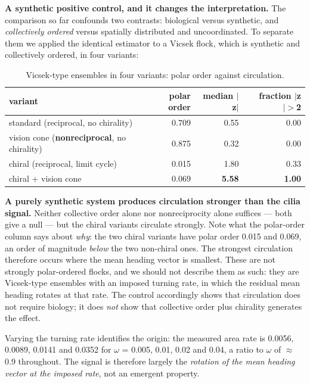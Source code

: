 \documentclass[aps,pre,preprint,superscriptaddress,nofootinbib,longbibliography]{revtex4-2}
\begin{document}
\textbf{A synthetic positive control, and it changes the interpretation.} The comparison so far confounds two contrasts: biological versus synthetic, and \emph{collectively ordered} versus spatially distributed and uncoordinated. To separate them we applied the identical estimator to a Vicsek flock, which is synthetic and collectively ordered, in four variants:

\begin{table}[htbp]
\caption{Vicsek-type ensembles in four variants: polar order against circulation.}
\label{tab:20}
\begin{ruledtabular}
\begin{tabular}{lrrr}
variant & polar order & median $|$z$|$ & fraction $|$z$| >$2 \\
\hline
standard (reciprocal, no chirality) & 0.709 & 0.55 & 0.00 \\
vision cone (\textbf{nonreciprocal}, no chirality) & 0.875 & 0.32 & 0.00 \\
chiral (reciprocal, limit cycle) & 0.015 & 1.80 & 0.33 \\
chiral + vision cone & 0.069 & \textbf{5.58} & \textbf{1.00} \\
\end{tabular}
\end{ruledtabular}
\end{table}

\textbf{A purely synthetic system produces circulation stronger than the cilia signal.} Neither collective order alone nor nonreciprocity alone suffices --- both give a null --- but the chiral variants circulate strongly. Note what the polar-order column says about \emph{why}: the two chiral variants have polar order 0.015 and 0.069, an order of magnitude \emph{below} the two non-chiral ones. The strongest circulation therefore occurs where the mean heading vector is smallest. These are not strongly polar-ordered flocks, and we should not describe them as such: they are Vicsek-type ensembles with an imposed turning rate, in which the residual mean heading rotates at that rate. The control accordingly shows that circulation does not require biology; it does \emph{not} show that collective order plus chirality generates the effect.

Varying the turning rate identifies the origin: the measured area rate is 0.0056, 0.0089, 0.0141 and 0.0352 for $\omega$ = 0.005, 0.01, 0.02 and 0.04, a ratio to $\omega$ of $\approx$0.9 throughout. The signal is therefore largely the \emph{rotation of the mean heading vector at the imposed rate}, not an emergent property.
\end{document}
